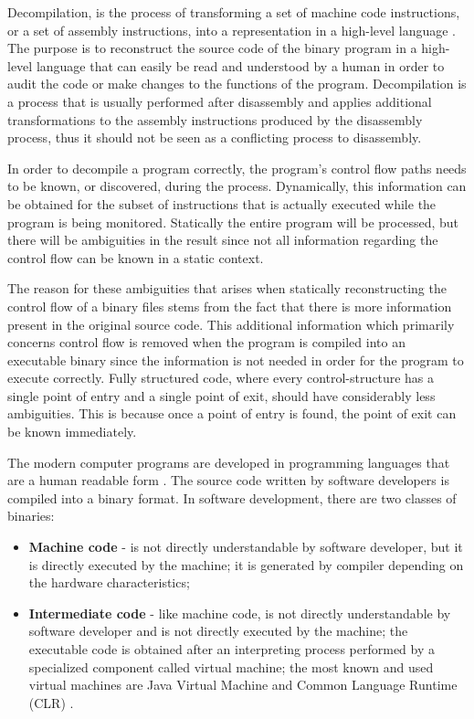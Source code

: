 Decompilation, is the process of transforming a set of machine code instructions, or a set of assembly instructions, into a representation in a high-level language \cite{Cifuentes}. The purpose is to reconstruct the source code of the binary program in a high-level language that can easily be read and understood by a human in order to audit the code or make changes to the functions of the program. Decompilation is a process that is usually performed after disassembly and applies additional transformations to the assembly instructions produced by the disassembly process, thus it should not be seen as a conflicting process to disassembly.

In order to decompile a program correctly, the program’s control flow paths needs to be known, or discovered, during the process. Dynamically, this information can be obtained for the subset of instructions that is actually executed while the program is being monitored. Statically the entire program will be processed, but there will be ambiguities in the result since not all information regarding the control flow can be known in a static context.

The reason for these ambiguities that arises when statically reconstructing the control flow of a binary files stems from the fact that there is more information present in the original source code. This additional information which primarily concerns control flow is removed when the program is compiled into an executable binary since the information is not needed in order for the program to execute correctly. Fully structured code, where every control-structure has a single point of entry and a single point of exit, should have considerably less ambiguities. This is because once a point of entry is found, the point of exit can be known immediately.

The modern computer programs are developed in programming languages that are a human readable form \cite{Agrawal, Kargen, Allen}. The source code written by software developers is compiled into a binary format. In software development, there are two classes of binaries: 

\begin{itemize}
	\item \textbf{Machine code }- is not directly understandable by software developer, but it is directly executed by the machine; it is generated by compiler depending on the hardware characteristics;  
	\item \textbf{Intermediate code }- like machine code, is not directly understandable by software developer and is not directly executed by the machine; the executable code is obtained  after an interpreting process performed by a specialized component called virtual machine; the most known and used virtual machines are Java Virtual Machine and Common Language Runtime (CLR) \cite{Fer, Cytron}.
\end{itemize}


